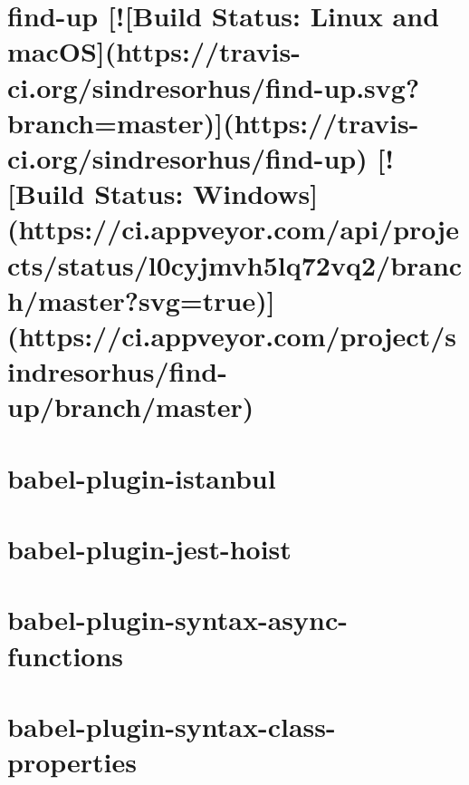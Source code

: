 \documentclass[twoside]{book}
\newcommand{\+}{\discretionary{\mbox{\scriptsize$\hookleftarrow$}}{}{}}
\begin{document}
\chapter{find-\/up \mbox{[}!\mbox{[}Build Status\+: Linux and mac\+OS\mbox{]}(https\+://travis-\/ci.org/sindresorhus/find-\/up.svg?branch=master)\mbox{]}(https\+://travis-\/ci.org/sindresorhus/find-\/up) \mbox{[}!\mbox{[}Build Status\+: Windows\mbox{]}(https\+://ci.appveyor.\+com/api/projects/status/l0cyjmvh5lq72vq2/branch/master?svg=true)\mbox{]}(https\+://ci.appveyor.\+com/project/sindresorhus/find-\/up/branch/master)}
\label{md__c_1_workspace_demo_src_main_script_node_modules_babel-plugin-istanbul_node_modules_find-up_readme}

\chapter{babel-\/plugin-\/istanbul}
\label{md__c_1_workspace_demo_src_main_script_node_modules_babel-plugin-istanbul__r_e_a_d_m_e}

\chapter{babel-\/plugin-\/jest-\/hoist}
\label{md__c_1_workspace_demo_src_main_script_node_modules_babel-plugin-jest-hoist__r_e_a_d_m_e}

\chapter{babel-\/plugin-\/syntax-\/async-\/functions}
\label{md__c_1_workspace_demo_src_main_script_node_modules_babel-plugin-syntax-async-functions__r_e_a_d_m_e}

\chapter{babel-\/plugin-\/syntax-\/class-\/properties}
\label{md__c_1_workspace_demo_src_main_script_node_modules_babel-plugin-syntax-class-properties__r_e_a_d_m_e}

\end{document}
